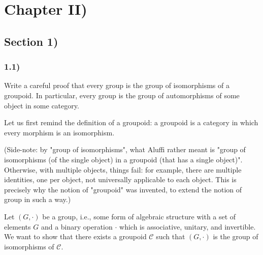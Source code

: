 \newpage

\chapter*{Chapter II)}

\section*{Section 1)}

\subsection*{1.1)}

Write a careful proof that every group is the group of isomorphisms of a groupoid. In particular, every group is the group of automorphisms of some object in some category.

Let us first remind the definition of a groupoid: a groupoid is a category in which every morphism is an isomorphism.

(Side-note: by "group of isomorphisms", what Aluffi rather meant is "group of isomorphisms (of the single object) in a groupoid (that has a single object)". Otherwise, with multiple objects, things fail: for example, there are multiple identities, one per object, not universally applicable to each object. This is precisely why the notion of "groupoid" was invented, to extend the notion of group in such a way.)

Let $(G, \cdot)$ be a group, i.e., some form of algebraic structure with a set of elements $G$ and a binary operation $\cdot$ which is associative, unitary, and invertible. We want to show that there exists a groupoid $\mathcal{C}$ such that $(G, \cdot)$ is the group of isomorphisms of $\mathcal{C}$.

